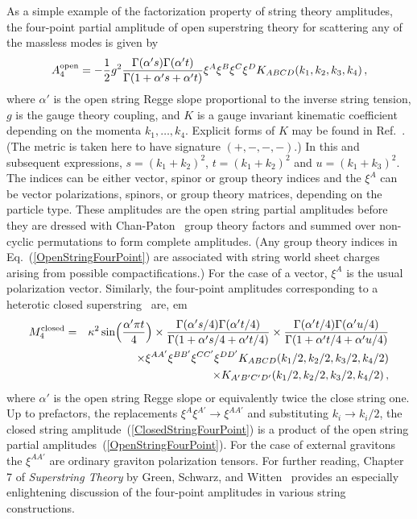 \documentclass[12pt]{livrev}
\begin{document}
As a simple example of the factorization property of string 
theory amplitudes, the four-point partial amplitude of open 
superstring theory for scattering any of the massless modes is given by 
%
\begin{equation}
A_4^{\rm open} = 
-{1\over 2} g^2 {\Gamma(\alpha's)  \Gamma(\alpha' t) \over 
\Gamma(1 + \alpha's + \alpha' t)} 
\xi^A \xi^B \xi^C \xi^D
K_{A B C D}(k_1, k_2, k_3, k_4) \,,
\label{OpenStringFourPoint}
\end{equation}
%
where $\alpha'$ is the open string Regge slope proportional to the
inverse string tension, $g$ is the gauge theory coupling, and $K$ is a
gauge invariant kinematic coefficient depending on the momenta $k_1,
\ldots, k_4$. Explicit forms of $K$ may be found in Ref.~\cite{GSW}.
(The metric is taken here to have signature
$(+,-,-,-)$.)  In this and subsequent expressions, $s = (k_1 +
k_2)^2$, $t = (k_1 + k_2)^2$ and $u = (k_1 + k_3)^2$.  The indices can
be either vector, spinor or group theory indices and the $\xi^A$ can
be vector polarizations, spinors, or group theory matrices, depending
on the particle type.  These amplitudes are the open string partial
amplitudes before they are dressed with Chan-Paton~\cite{ChanPaton} group
theory factors and summed over non-cyclic permutations to form
complete amplitudes. (Any group theory indices in
Eq.~(\ref{OpenStringFourPoint}) are associated with string world sheet
charges arising from possible compactifications.)  For the case of a
vector, $\xi^A$ is the usual polarization vector.  Similarly, the
four-point amplitudes corresponding to a heterotic closed
superstring~\cite{Gross85Heterotic,Gross86Heterotic} are,
% 
 em
\begin{eqnarray}
M_4^{\rm closed} &=& 
\kappa^2  \sin\Bigl({\alpha' \pi t \over 4} \Bigr) \times 
 {\Gamma(\alpha's/4)  \Gamma(\alpha't/4) \over 
      \Gamma(1 + \alpha's/4 + \alpha' t/4)}
\times  {\Gamma(\alpha't/4)  \Gamma(\alpha' u/4) 
      \over \Gamma(1 + \alpha't/4 + \alpha'u/4)} \nonumber \\
&& \times 
\xi^{AA'} \xi^{BB'} \xi^{CC'} \xi^{DD'}
K_{A B C D}(k_1/2, k_2/2, k_3/2, k_4/2) \nonumber \\
&& \hskip 3 cm \times
K_{A' B' C' D'}(k_1/2, k_2/2, k_3/2, k_4/2) \,,
\label{ClosedStringFourPoint}
\end{eqnarray}
%
where $\alpha'$ is the open string Regge slope or equivalently twice
the close string one.
Up to prefactors, the
replacements $\xi^A \xi^{A'} \rightarrow \xi^{A A'}$ and substituting  $k_i
\rightarrow k_i/2$, the closed string
amplitude~(\ref{ClosedStringFourPoint}) is a product of the open
string partial amplitudes~(\ref{OpenStringFourPoint}).  For the case of
external gravitons the $\xi^{AA'}$ are ordinary graviton polarization
tensors.  For further reading, Chapter 7 of {\it Superstring Theory}
by Green, Schwarz, and Witten~\cite{GSW} provides an especially
enlightening discussion of the four-point amplitudes in various string
constructions.
\end{document}
